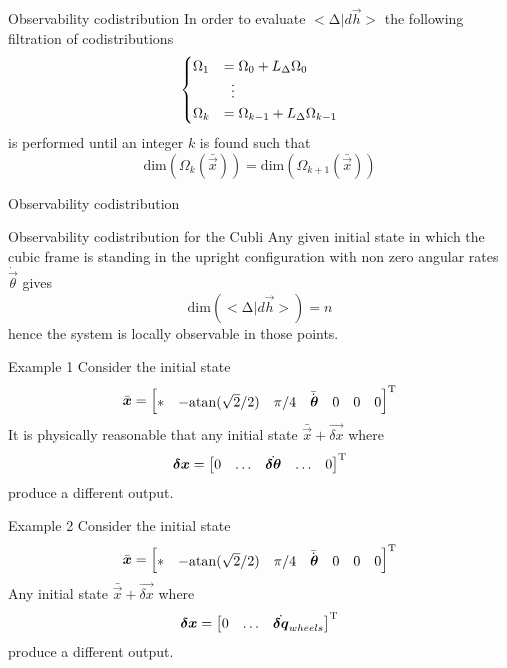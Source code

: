 \begin{frame}{Observability codistribution \theory}
In order to evaluate $< \mathrm{\Delta}|d\vec{h} >$
 the following filtration of codistributions
\[
\begin{cases}
\Omega_1 &= \Omega_0 + L_\Delta \Omega_0\\
&\vdotswithin{=} \\
\Omega_k &= \Omega_{k-1} + L_\Delta \Omega_{k-1}
\end{cases}
\]
is performed until an integer $k$ is found such that
\[
\mathrm{dim}(\Omega_{k}(\bar{\vec{x}})) = \mathrm{dim}(\Omega_{k + 1}(\bar{\vec{x}}))
\]
\end{frame}

\begin{frame}{Observability codistribution \cubli}
  \begin{exampleblock}{Observability codistribution for the Cubli}
    Any given initial state in which the cubic frame is standing in the upright
    configuration with \alert{non zero angular rates $\dot{\vec{\theta}}$} gives
    \[
    \mathrm{dim} (<\mathrm{\Delta} | d\vec{h}>) = n
    \]
    hence the system \alert{is locally observable} in those points.
  \end{exampleblock}
\end{frame}

\begin{frame}{Example 1 \cubli}
  Consider the initial state 
  \[
  \bar{\boldsymbol{x}} = 
  \begin{bmatrix}
    * & -\mathrm{atan}(\sqrt{2}/2) & \pi/4 & \bar{\dot{\boldsymbol{\theta}}} & 0 & 0 & 0
  \end{bmatrix}^{\mathrm{T}}
  \]
  It is physically reasonable that any initial state $\bar{\vec{x}} + \vec{\delta x}$ where
  \[
  \boldsymbol{\delta x} = \begin{bmatrix}
    0 & \hdots & \dot{\boldsymbol{\delta \theta}} & \hdots & 0
  \end{bmatrix}^{\mathrm{T}}
  \]
  produce a different output.
\end{frame}

\begin{frame}{Example 2 \cubli}
  Consider the initial state 
  \[
  \bar{\boldsymbol{x}} = 
  \begin{bmatrix}
    * & -\mathrm{atan}(\sqrt{2}/2) & \pi/4 & \bar{\dot{\boldsymbol{\theta}}} & 0 & 0 & 0
  \end{bmatrix}^{\mathrm{T}}
  \]
  Any initial state $\bar{\vec{x}} + \vec{\delta x}$ where
  \[
  \boldsymbol{\delta x} = \begin{bmatrix}
    0 & \hdots & \dot{\boldsymbol{\delta q}}_{wheels}
  \end{bmatrix}^{\mathrm{T}}
  \]
  produce a different output.
\end{frame}

